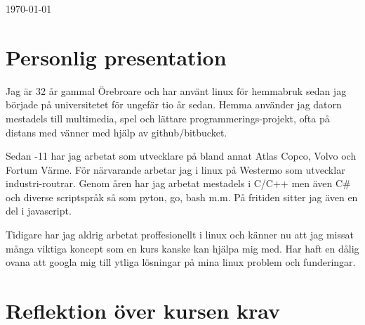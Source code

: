 \documentclass[11pt]{article}
\begin{document}
\begin{titlepage}
	
	\vfill\vfill\vfill %
	
	{\large\today} %
	
	
	 
	
	\vfill %
	
\end{titlepage}


\section{Personlig presentation}

Jag är 32 år gammal Örebroare och har använt linux för hemmabruk sedan jag började på universitetet för ungefär tio år sedan. Hemma använder jag datorn mestadels till multimedia, spel och lättare programmerings-projekt, ofta på distans med vänner med hjälp av github/bitbucket.

Sedan -11 har jag arbetat som utvecklare på bland annat Atlas Copco, Volvo och Fortum Värme. För närvarande arbetar jag i linux på Westermo som utvecklar industri-routrar. Genom åren har jag arbetat mestadels i C/C++ men även C\# och diverse scriptspråk så som pyton, go, bash m.m. På fritiden sitter jag även en del i javascript.

Tidigare har jag aldrig arbetat proffesionellt i linux och känner nu att jag missat många viktiga koncept som en kurs kanske kan hjälpa mig med. Har haft en dålig ovana att googla mig till ytliga lösningar på mina linux problem och funderingar. 

\section{Reflektion över kursen krav}
\end{document}
